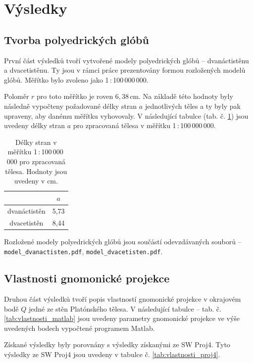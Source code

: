 \documentclass[12pt]{article}
\begin{document}
\newpage
{\section {Výsledky}}
\subsection{Tvorba polyedrických glóbů}

První část výsledků tvoří vytvořené modely polyedrických glóbů – dvanáctistěnu a dvacetistěnu. Ty jsou v rámci práce prezentovány formou rozložených modelů glóbů. Měřítko bylo zvoleno jako 1\,:\,100\,000\,000.

Poloměr $r$ pro toto měřítko je roven $6,38$\,cm. Na základě této hodnoty byly následně vypočteny požadované délky stran $a$ jednotlivých těles a ty byly pak upraveny, aby danému měřítku vyhovovaly. V následující tabulce (tab. č. \ref{tab:delky_stran}) jsou uvedeny délky stran $a$ pro zpracovaná tělesa v měřítku 1\,:\,100\,000\,000.

\begin{table}[htbp]
    \centering
    \begin{tabular}{|c||c|}
        \hline
         & \textbf{$a$} \\
        \hline\hline
        dvanáctistěn & 5,73 \\
        \hline
        dvacetistěn & 8,44 \\
        \hline
    \end{tabular}
    \caption{Délky stran v měřítku 1\,:\,100\,000\,000 pro zpracovaná tělesa. Hodnoty jsou uvedeny v cm.}
    \label{tab:delky_stran}
\end{table}

Rozložené modely polyedrických glóbů jsou součástí odevzdávaných souborů – \texttt{model\_dvanactisten.pdf}, \texttt{model\_dvacetisten.pdf}.

\subsection{Vlastnosti gnomonické projekce}

Druhou část výsledků tvoří popis vlastností gnomonické projekce v okrajovém bodě $Q$ jedné ze stěn Platónského tělesa. V následující tabulce – tab. č. \ref{tab:vlastnosti_matlab} jsou uvedeny parametry gnomonické projekce ve výše uvedených bodech vypočtené programem Matlab.



Získané výsledky byly porovnány s výsledky získanými ze SW Proj4. Tyto výsledky ze SW Proj4 jsou uvedeny v tabulce č. \ref{tab:vlastnosti_proj4}.
\end{document}
